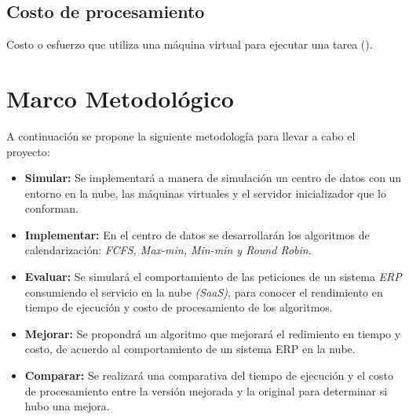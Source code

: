 \subsection*{Costo de procesamiento}

Costo o esfuerzo que utiliza una máquina virtual para ejecutar una tarea (\cite{redhat}). 

\newpage

\section{Marco Metodol\'ogico}

A continuaci\'on se propone la siguiente metodolog\'ia para llevar a cabo el proyecto:

\begin{itemize}
	\item \textbf{Simular:} Se implementar\'a a manera de simulaci\'on un centro de datos con un entorno en la nube, las m\'aquinas virtuales y el servidor inicializador que lo conforman.
	\item \textbf{Implementar:} En el centro de datos se desarrollar\'an los algoritmos de calendarizaci\'on: \textit{FCFS, Max-min, Min-min y Round Robin}.
	\item \textbf{Evaluar:} Se simular\'a el comportamiento de las peticiones de un sistema \textit{ERP} consumiendo el servicio en la nube \textit{(SaaS)}, para conocer el rendimiento en tiempo de ejecuci\'on y costo de procesamiento de los algoritmos.
	\item \textbf{Mejorar:} Se propondrá un algoritmo que mejorará el redimiento en tiempo y costo, de acuerdo al comportamiento de un sistema ERP en la nube.
	\item \textbf{Comparar:} Se realizar\'a una comparativa del tiempo de ejecuci\'on y el costo de procesamiento entre la versi\'on mejorada y la original para determinar si hubo una mejora.
\end{itemize}




